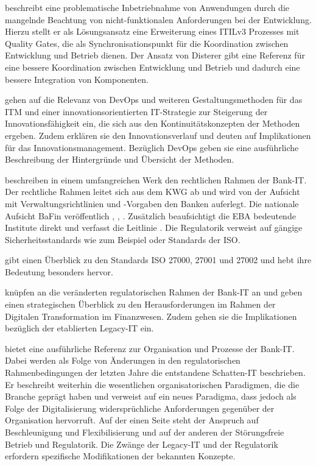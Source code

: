 \citet{mci/Disterer2011} beschreibt eine problematische Inbetriebnahme von Anwendungen durch die mangelnde Beachtung von nicht-funktionalen Anforderungen bei der Entwicklung. Hierzu stellt er als Lösungsansatz eine Erweiterung eines ITILv3 Prozesses mit Quality Gates, die als Synchronisationspunkt für die Koordination zwischen Entwicklung und Betrieb dienen. Der Ansatz von Disterer gibt eine Referenz für eine bessere Koordination zwischen Entwicklung und Betrieb und dadurch eine bessere Integration von Komponenten.

\citet{Alt2017} gehen auf die Relevanz von DevOps und weiteren Gestaltungsmethoden für das \ac{ITM} und einer innovationsorientierten IT-Strategie zur Steigerung der Innovationsfähigkeit ein, die sich aus den Kontinuitätskonzepten der Methoden ergeben. Zudem erklären sie den Innovationsverlauf und deuten auf Implikationen für das Innovationsmanagement. Bezüglich DevOps geben sie eine ausführliche Beschreibung der Hintergründe und Übersicht der Methoden.

\citet{recht/Bornemann2018} beschreiben in einem umfangreichen Werk den rechtlichen Rahmen der Bank-IT.
Der rechtliche Rahmen leitet sich aus dem \ac{KWG} ab und wird von der Aufsicht mit Verwaltungsrichtlinien und -Vorgaben den Banken auferlegt. Die nationale Aufsicht \ac{BaFin} veröffentlich \cite{MaRisk:2017}, \cite{MaRiskErläuterungen:2017}, \cite{BAIT:2018}. Zusätzlich beaufsichtigt die \ac{EBA} bedeutende Institute direkt und verfasst die Leitlinie \cite{eba:2019}. Die Regulatorik verweist auf gängige Sicherheitsstandards wie zum Beispiel \cite{IT-Grundschutz:2020} oder Standards der \ac{ISO}.

\citet{mci/Disterer2011} gibt einen Überblick zu den Standards \ac{ISO} 27000, 27001 und 27002 und hebt ihre Bedeutung besonders hervor.

\citet{Strietzel2018} knüpfen an die veränderten regulatorischen Rahmen der Bank-IT an und geben einen strategischen Überblick zu den Herausforderungen im Rahmen der Digitalen Transformation im Finanzwesen. Zudem gehen sie die Implikationen bezüglich der etablierten Legacy-IT ein.

\citet{Dorschel2018} bietet eine ausführliche Referenz zur Organisation und Prozesse der Bank-IT. Dabei werden als Folge von Änderungen in den regulatorischen Rahmenbedingungen der letzten Jahre die entstandene Schatten-IT beschrieben. Er beschreibt weiterhin die wesentlichen organisatorischen Paradigmen, die die Branche geprägt haben und verweist auf ein neues Paradigma, dass jedoch als Folge der Digitalisierung widersprüchliche Anforderungen gegenüber der Organisation hervorruft. Auf der einen Seite steht der Anspruch auf Beschleunigung und Flexibilisierung und auf der anderen der Störungsfreie Betrieb und Regulatorik. Die Zwänge der Legacy-IT und der Regulatorik erfordern spezifische Modifikationen der bekannten Konzepte.


